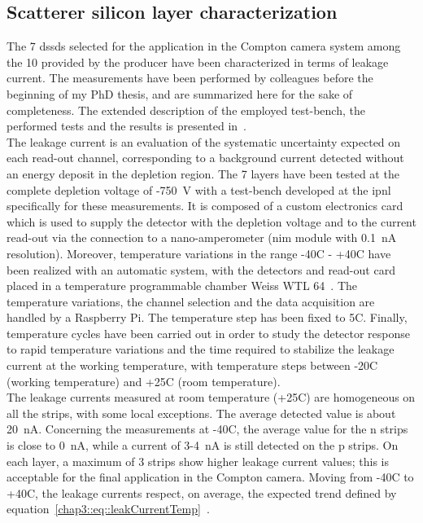 \subsection{Scatterer silicon layer characterization}\label{chap3::subsec::scattSichar}

The 7 \glspl{dssd} selected for the application in the Compton camera system among the 10 provided by the producer have been characterized in terms of leakage current. The measurements have been performed by colleagues before the beginning of my PhD thesis, and are summarized here for the sake of completeness. The extended description of the employed test-bench, the performed tests and the results is presented in~\cite{Ley2015}.\\
The leakage current is an evaluation of the systematic uncertainty expected on each read-out channel, corresponding to a background current detected without an energy deposit in the depletion region. The 7 layers have been tested at the complete depletion voltage of -750~V with a test-bench developed at the \gls{ipnl} specifically for these measurements. It is composed of a custom electronics card which is used to supply the detector with the depletion voltage and to the current read-out via the connection to a nano-amperometer (\gls{nim} module with 0.1~nA resolution).  Moreover, temperature variations in the range -40\textdegree{}C - +40\textdegree{}C have been realized with an automatic system, with the detectors and read-out card placed in a temperature programmable chamber Weiss WTL 64~\parencite{WeissTechnik2017}. The temperature variations, the channel selection and the data acquisition are handled by a Raspberry Pi. The temperature step has been fixed to 5\textdegree{}C. Finally, temperature cycles have been carried out in order to study the detector response to rapid temperature variations and the time required to stabilize the leakage current at the working temperature, with temperature steps between -20\textdegree{}C (working temperature) and +25\textdegree{}C (room temperature).\\
The leakage currents measured at room temperature (+25\textdegree{}C) are homogeneous on all the strips, with some local exceptions. The average detected value is about 20~nA. Concerning the measurements at -40\textdegree{}C, the average value for the n strips is close to 0~nA, while a current of 3-4~nA is still detected on the p strips. On each layer, a maximum of 3 strips show higher leakage current values; this is acceptable for the final application in the Compton camera. Moving from -40\textdegree{}C to +40\textdegree{}C, the leakage currents respect, on average, the expected trend defined by equation~\ref{chap3::eq::leakCurrentTemp}~\parencite{Spieler1998}.\\

